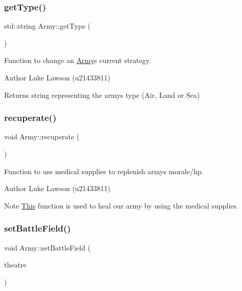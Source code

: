 \subsubsection{\texorpdfstring{getType()}{getType()}}
{\footnotesize\ttfamily std\+::string Army\+::get\+Type (\begin{DoxyParamCaption}{ }\end{DoxyParamCaption})}



Function to change an \mbox{\hyperlink{class_army}{Army}}\textquotesingle{}s current strategy. 

\begin{DoxyAuthor}{Author}
Luke Lawson (u21433811) 
\end{DoxyAuthor}
\begin{DoxyReturn}{Returns}
string representing the army\textquotesingle{}s type (Air, Land or Sea) 
\end{DoxyReturn}
\mbox{\label{class_army_aa8a3e8d9a987b5db2bc53dffd75a4596}} 
\subsubsection{\texorpdfstring{recuperate()}{recuperate()}}
{\footnotesize\ttfamily void Army\+::recuperate (\begin{DoxyParamCaption}{ }\end{DoxyParamCaption})}



Function to use medical supplies to replenish army\textquotesingle{}s morale/hp. 

\begin{DoxyAuthor}{Author}
Luke Lawson (u21433811) 
\end{DoxyAuthor}
\begin{DoxyNote}{Note}
\mbox{\hyperlink{class_this}{This}} function is used to heal our army by using the medical supplies. 
\end{DoxyNote}
\mbox{\label{class_army_a2150e3e29e2fac86401b0263ec0e18d9}} 
\subsubsection{\texorpdfstring{setBattleField()}{setBattleField()}}
{\footnotesize\ttfamily void Army\+::set\+Battle\+Field (\begin{DoxyParamCaption}\item[{\mbox{\hyperlink{class_war_theatre}{War\+Theatre}} $\ast$}]{theatre }\end{DoxyParamCaption})}




